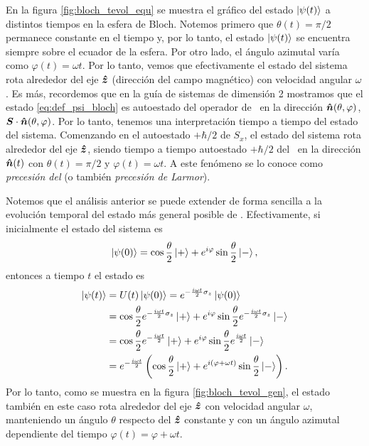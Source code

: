 \documentclass[10pt, a4paper]{article}
\newcommand{\wt}{\omega t}
\numberwithin{equation}{subsection}
\begin{document}
En la figura \ref{fig:bloch_tevol_equ} se muestra el gráfico del estado
$\ket{\psi(t)}$ a distintos tiempos en la esfera de Bloch. Notemos primero que
$\theta(t) = \pi/2$ permanece constante en el tiempo y, por lo tanto, el estado
$\ket{\psi(t)}$ se encuentra siempre sobre el ecuador de la esfera. Por otro
lado, el ángulo azimutal varía como $\varphi(t) = \wt$. Por lo tanto, vemos que
efectivamente el estado del sistema rota alrededor del eje $\vu*{z}$
(dirección del campo magnético) con velocidad angular $\omega$. Es más,
recordemos que en la guía de sistemas de dimensión 2 mostramos que el estado
\eqref{eq:def_psi_bloch} es autoestado del operador de \spin\ en la dirección
$\vu*{n}(\theta,\varphi)$, $\vb*{S}\cdot\vu*{n}(\theta,\varphi)$. Por lo
tanto, tenemos una interpretación tiempo a tiempo del estado del sistema.
Comenzando en el autoestado $+\hbar/2$ de $S_x$, el estado del sistema rota
alrededor del eje $\vu*{z}$, siendo tiempo a tiempo autoestado $+\hbar/2$ del
\spin\ en la dirección $\vu*{n}(t)$ con $\theta(t) = \pi/2$ y $\varphi(t) =
\wt$. A este fenómeno se lo conoce como \emph{precesión del \spin} (o también
\emph{precesión de Larmor}).


\bigbreak

Notemos que el análisis anterior se puede extender de forma sencilla a la
evolución temporal del estado más general posible de \spinhalf. Efectivamente,
si inicialmente el estado del sistema es
\begin{equation}
  \ket{\psi(0)} = \cos\frac{\theta}{2}\ket{+} +
  e^{i\varphi}\sin\frac{\theta}{2}\ket{-},
\end{equation}
entonces a tiempo $t$ el estado es
\begin{align}
  \ket{\psi(t)} &= U(t)\ket{\psi(0)} = e^{-\frac{i\wt}{2}\sigma_z}\ket{\psi(0)}
    \nonumber \\
  &= \cos\frac{\theta}{2}e^{-\frac{i\wt}{2}\sigma_z}\ket{+} +
    e^{i\varphi}\sin\frac{\theta}{2}e^{-\frac{i\wt}{2}\sigma_z}\ket{-}
    \nonumber \\
  &= \cos\frac{\theta}{2}e^{-\frac{i\wt}{2}}\ket{+} +
    e^{i\varphi}\sin\frac{\theta}{2}e^{\frac{i\wt}{2}}\ket{-} \nonumber \\
  &= e^{-\frac{i\wt}{2}}\left(\cos\frac{\theta}{2}\ket{+} +
    e^{i\left(\varphi + \wt\right)}\sin\frac{\theta}{2}\ket{-}\right).
\end{align}
Por lo tanto, como se muestra en la figura \ref{fig:bloch_tevol_gen}, el estado
también en este caso rota alrededor del eje $\vu*{z}$ con velocidad angular
$\omega$, manteniendo un ángulo $\theta$ respecto del $\vu*{z}$ constante y con
un ángulo azimutal dependiente del tiempo $\varphi(t) = \varphi + \wt$.
\end{document}
